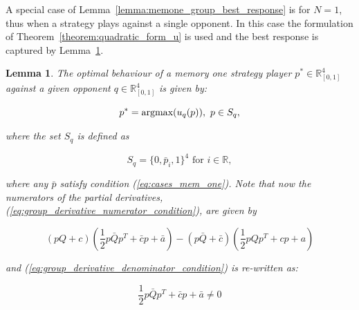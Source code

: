 \documentclass[10pt]{article}
\newcommand{\R}{\mathbb{R}}
\newtheorem{lemma}[theorem]{Lemma}
\begin{document}
A special case of Lemma~\ref{lemma:memone_group_best_response} is for \(N=1\),
thus when a strategy plays against a single opponent. In this case the formulation
of Theorem~\ref{theorem:quadratic_form_u} is used and the best response is captured
by Lemma~\ref{lemma:memone_best_response}.

\begin{lemma}\label{lemma:memone_best_response}
    The optimal behaviour of a memory one strategy player \(p^* \in \R_{[0, 1]} ^ 4\)
    against a given opponent \(q \in \R_{[0, 1]} ^ 4\) is given by:
    
    \[p^* = \textnormal{argmax}(u_q(p)), \ p \in S_q,\]
    
    where the set \(S_q\) is defined as 
    
    \[S_q = \{0, \bar{p}_i, 1 \}^4 \text{ for } i \in \R,\]
    
    where any \(\bar{p}\) satisfy condition (\ref{eq:cases_mem_one}). Note that now
    the numerators of the partial derivatives, (\ref{eq:group_derivative_numerator_condition}),
    are given by
    
    {\small
    \begin{equation}\label{eq:derivative_numerator_condition}
        (pQ + c) ( \frac{1}{2} p  \bar{Q}  p^T + \bar{c}  p + \bar{a}) 
        - (p\bar{Q} + \bar{c})( \frac{1}{2} p  Q  p^T + c p + a)
    \end{equation}}

    and (\ref{eq:group_derivative_denominator_condition}) is re-written as:

    {\small
    \begin{equation}\label{eq:derivative_denominator_condition}
        \frac{1}{2} p  \bar{Q}  p^T + \bar{c}  p + \bar{a} \neq 0
    \end{equation}}
\end{lemma}
\end{document}
